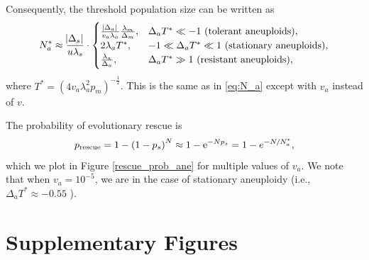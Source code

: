 \documentclass[12pt]{extarticle}
\newcommand{\e}{{\rm e}}
\newcommand{\presc}{p_\text{rescue}}
\newcommand{\beginsupplement}{%
      	\setcounter{table}{0}
        \renewcommand{\thetable}{S\arabic{table}}%
        \setcounter{figure}{0}
        \renewcommand{\thefigure}{S\arabic{figure}}%
		\setcounter{equation}{0}
        \renewcommand{\theequation}{A\arabic{equation}}%
}
\begin{document}
\begin{appendices}
Consequently, the threshold population size can be written as
\begin{equation}\label{eq:N_a2}
\begin{aligned}
N_a^* \approx 
  \frac{\abs{\Delta_s}}{u\lambda_s} \cdot \begin{cases}
    \frac{\abs{\Delta_a}}{v_a\lambda_a}  \frac{\lambda_m}{\Delta_m} ,&
  \Delta_a T^* \ll -1 \text{ (tolerant aneuploids)},\\ 
  2\lambda_a T^* ,&
  -1 \ll \Delta_a T^* \ll 1  \text{ (stationary aneuploids)},\\ 
  \frac{\lambda_a}{\Delta_a} ,&
   \Delta_a T^* \gg 1 \text{ (resistant aneuploids)},
  \end{cases}
\end{aligned}
\end{equation}
where $T^*=\left(4v_a\lambda_a^2p_m\right)^{-\frac{1}{2}}$.
This is the same as in \cref{eq:N_a} except with $v_a$ instead of $v$.

The probability of evolutionary rescue is
\begin{equation} \label{eq:rescue_prob_ane} 
\presc = 
1-\left(1-p_s\right)^N \approx
1-\e^{-Np_s} = 
1-e^{-N/N_a^*} ,
\end{equation}
which we plot in Figure \ref{rescue_prob_ane} for multiple values of $v_a$. We note that when $v_a=10^{-5}$, we are in the case of stationary aneuploidy (i.e., $\Delta_a T^*\approx -0.55$ ). 

\newpage
\section*{Supplementary Figures}
\beginsupplement %


\end{appendices}
\end{document}
